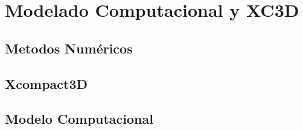 \chapter{Modelado Computacional y XC3D}

\section{Metodos Numéricos}

\section{Xcompact3D}
\cite{kawamura2000dns}
\section{Modelo Computacional}

\cite{moser1999}




